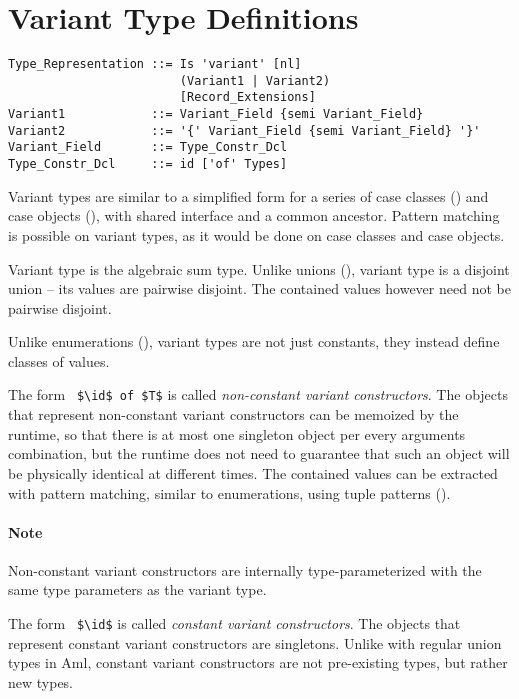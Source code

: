 \section{Variant Type Definitions}
\label{sec:variant-types}

\syntax\begin{lstlisting}
Type_Representation ::= Is 'variant' [nl]
                        (Variant1 | Variant2)
                        [Record_Extensions]
Variant1            ::= Variant_Field {semi Variant_Field}
Variant2            ::= '{' Variant_Field {semi Variant_Field} '}'
Variant_Field       ::= Type_Constr_Dcl
Type_Constr_Dcl     ::= id ['of' Types]
\end{lstlisting}

Variant types are similar to a simplified form for a series of case classes () and case objects (), with shared interface and a common ancestor. Pattern matching is possible on variant types, as it would be done on case classes and case objects. 

Variant type is the algebraic sum type. Unlike unions (), variant type is a disjoint union -- its values are pairwise disjoint. The contained values however need not be pairwise disjoint. 

Unlike enumerations (), variant types are not just constants, they instead define classes of values. 

The form ~\lstinline!$\id$ of $T$! is called {\em non-constant variant constructors}. The objects that represent non-constant variant constructors can be memoized by the runtime, so that there is at most one singleton object per every arguments combination, but the runtime does not need to guarantee that such an object will be physically identical at different times. The contained values can be extracted with pattern matching, similar to enumerations, using tuple patterns (). 

\paragraph{Note}
Non-constant variant constructors are internally type-parameterized with the same type parameters as the variant type. 

The form ~\lstinline!$\id$! is called {\em constant variant constructors}. The objects that represent constant variant constructors are singletons. Unlike with regular union types in Aml, constant variant constructors are not pre-existing types, but rather new types. 

